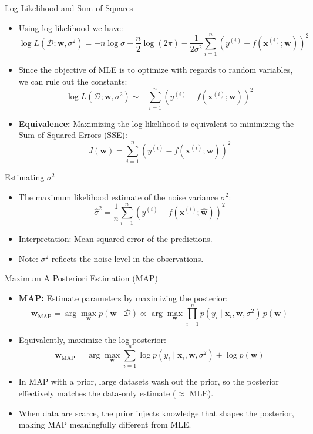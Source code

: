 \documentclass[serif, aspectratio=169]{beamer}
\begin{document}
\begin{frame}{Log-Likelihood and Sum of Squares}
    \begin{itemize}
        \item Using log-likelihood we have:
        \[
        \log L(\mathcal{D}; \mathbf{w}, \sigma^2) = -n \log \sigma - \frac{n}{2} \log(2\pi) - \frac{1}{2\sigma^2} \sum_{i=1}^n (y^{(i)} - f(\mathbf{x}^{(i)}; \mathbf{w}))^2
        \]
        \item Since the objective of MLE is to optimize with regards to random variables, we can rule out the constants:
        \[
        \log L(\mathcal{D}; \mathbf{w}, \sigma^2) \sim - \sum_{i=1}^n (y^{(i)} - f(\mathbf{x}^{(i)}; \mathbf{w}))^2
        \]
        \item \textbf{Equivalence:} Maximizing the log-likelihood is equivalent to minimizing the Sum of Squared Errors (SSE):
        \[
        J(\mathbf{w}) = \sum_{i=1}^n (y^{(i)} - f(\mathbf{x}^{(i)}; \mathbf{w}))^2
        \]
    \end{itemize}
\end{frame}

\begin{frame}{Estimating \( \sigma^2 \)}
    \begin{itemize}
        \item The maximum likelihood estimate of the noise variance \( \sigma^2 \):
        \[
        \hat{\sigma}^2 = \frac{1}{n} \sum_{i=1}^n \left( y^{(i)} - f(\mathbf{x}^{(i)}; \hat{\mathbf{w}}) \right)^2
        \]
        \item Interpretation: Mean squared error of the predictions.
        \item Note: \( \sigma^2 \) reflects the noise level in the observations.
    \end{itemize}
\end{frame}

\begin{frame}{Maximum A Posteriori Estimation (MAP)}
    \begin{itemize}
        \item \textbf{MAP:} Estimate parameters by maximizing the posterior:
        \[
            \mathbf{w}_{\text{MAP}}
            = \arg\max_{\mathbf{w}}  p(\mathbf{w}\mid \mathcal{D})
            \propto \arg\max_{\mathbf{w}}  \prod_{i=1}^n p(y_i\mid \mathbf{x}_i,\mathbf{w},\sigma^2)\, p(\mathbf{w})
        \]
        \item Equivalently, maximize the log-posterior:
        \[
            \mathbf{w}_{\text{MAP}}
            = \arg\max_{\mathbf{w}}  \sum_{i=1}^n \log p(y_i\mid \mathbf{x}_i,\mathbf{w},\sigma^2) + \log p(\mathbf{w})
        \]
        \item
        In MAP with a prior, large datasets wash out the prior, so the posterior effectively matches the data-only estimate (\(\approx\) MLE).

        \item When data are scarce, the prior injects knowledge that shapes the posterior, making MAP meaningfully different from MLE.
    \end{itemize}
\end{frame}
\end{document}
